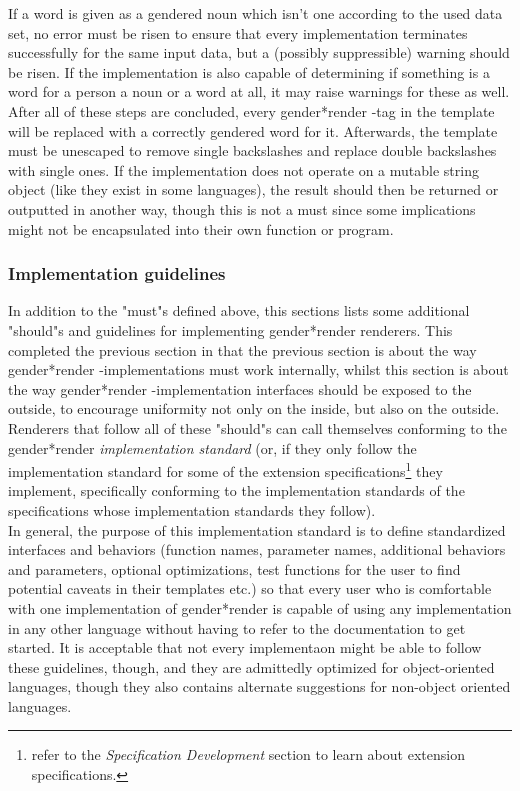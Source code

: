 \documentclass{article}
\newcommand{\GenderRender}{
    gender*render
}
\begin{document}
    If a word is given as a gendered noun which isn't one according to the used data set, no error must be risen to ensure that every implementation terminates successfully for the same input data, but a (possibly suppressible) warning should be risen.
    If the implementation is also capable of determining if something is a word for a person a noun or a word at all, it may raise warnings for these as well.\\

    After all of these steps are concluded, every \GenderRender-tag in the template will be replaced with a correctly gendered word for it.
    Afterwards, the template must be unescaped to remove single backslashes and replace double backslashes with single ones.
    If the implementation does not operate on a mutable string object (like they exist in some languages), the result should then be returned or outputted in another way, though this is not a must since some implications might not be encapsulated into their own function or program.\\

    \subsubsection{Implementation guidelines}

    In addition  to the "must"s defined above, this sections lists some additional "should"s and guidelines for implementing \GenderRender renderers.
    This completed the previous section in that the previous section is about the way \GenderRender-implementations must work internally, whilst this section is about the way \GenderRender-implementation interfaces should be exposed to the outside, to encourage uniformity not only on the inside, but also on the outside.\\
    Renderers that follow all of these "should"s can call themselves conforming to the \GenderRender \emph{implementation standard} (or, if they only follow the implementation standard for some of the extension specifications\footnote{refer to the \emph{Specification Development} section to learn about extension specifications.} they implement, specifically conforming to the implementation standards of the specifications whose implementation standards they follow).\\

    In general, the purpose of this implementation standard is to define standardized interfaces and behaviors (function names, parameter names, additional behaviors and parameters, optional optimizations, test functions for the user to find potential caveats in their templates etc.) so that every user who is comfortable with one implementation of \GenderRender is capable of using any implementation in any other language without having to refer to the documentation to get started.
    It is acceptable that not every implementaon might be able to follow these guidelines, though, and they are admittedly optimized for object-oriented languages, though they also contains alternate suggestions for non-object oriented languages.\\
\end{document}
